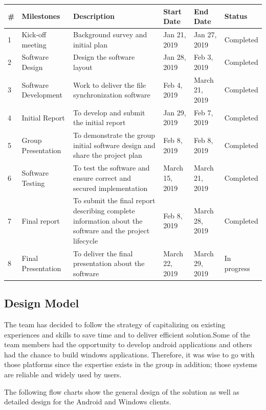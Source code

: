 \documentclass{article}
\begin{document}
\begin{center}
\begin{tabular}{ | m{3em} | m{2cm}| m{3cm} | m{1cm} | m{1cm} | m{2cm} |}
\hline
\textbf{\#} & \textbf{Milestones} & \textbf{Description} & \textbf{Start Date} & \textbf{End Date} & \textbf{Status}  \\
\hline
1 & Kick-off meeting & Background survey and initial plan & Jan 21, 2019 & Jan 27, 2019 & Completed \\
\hline
2 & Software Design  & Design the software layout & Jan 28, 2019 & Feb 3, 2019 & Completed \\
\hline
3 & Software Development & Work to deliver the file synchronization software & Feb 4, 2019 & March 21, 2019 & Completed \\
\hline
4 & Initial Report & To develop and submit the initial report & Jan 29, 2019 & Feb 7, 2019 & Completed \\
\hline
5 & Group Presentation & To demonstrate  the group initial software design and share the project plan & Feb 8, 2019 & Feb 8, 2019 & Completed \\
\hline
6 & Software Testing &  To test the software and ensure correct and secured implementation & March 15, 2019 & March 21, 2019 & Completed \\
\hline
7 & Final report & To submit the final report describing complete information about the software and the project lifecycle & Feb 8, 2019 & March 28, 2019 & Completed \\
\hline
8 & Final Presentation & To deliver the final presentation about the software & March 22, 2019 & March 29, 2019 & In progress \\
\hline
\end{tabular}
\end{center}

\subsection{Design Model}
The team has decided to follow the strategy of capitalizing on existing experiences and skills to save time and to deliver efficient solution.Some of the team members had the opportunity to develop android applications and others had the chance to build windows applications. Therefore, it was wise to go with those platforms since the expertise exists in the group in addition; those systems are reliable and widely used by users.

The following flow charts show the general design of the solution as well as detailed design for the Android and Windows clients.
\end{document}

